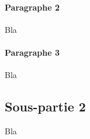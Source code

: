 \paragraph*{Paragraphe 2} Bla

\paragraph*{Paragraphe 3} Bla

\newpage

\subsection*{Sous-partie 2}

Bla

